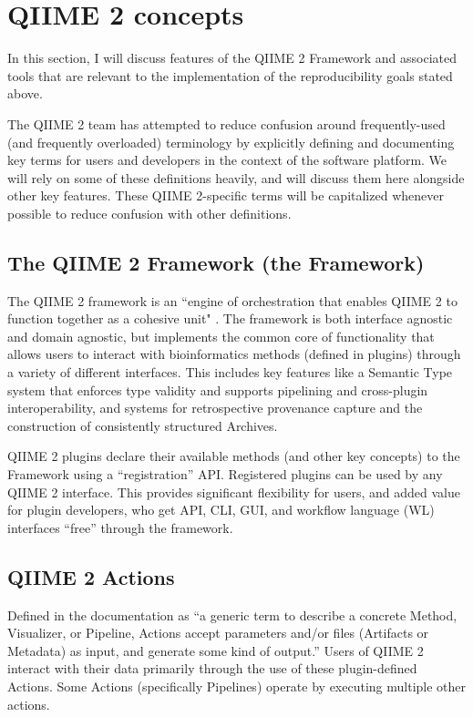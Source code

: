 \section{QIIME 2 concepts}

In this section, I will discuss features of the QIIME 2 Framework and associated
tools that are relevant to the implementation of the reproducibility goals
stated above. 

The QIIME 2 team has attempted to reduce confusion around frequently-used (and
frequently overloaded) terminology by explicitly defining and documenting key
terms for users \parencite{qiime_2_development_team_glossary_2016} and
developers \parencite{qiime_2_development_team_glossary_2018} in the context of
the software platform.  We will rely on some of these definitions heavily, and
will discuss them here alongside other key features. These QIIME 2-specific
terms will be capitalized whenever possible to reduce confusion with other
definitions.

\subsection{The QIIME 2 Framework (the Framework)}
The QIIME 2 framework is an “engine of orchestration that enables QIIME 2 to
function together as a cohesive unit" \parencite{qiime_2_development_team_glossary_2018}.
The framework is both interface agnostic and domain agnostic, but implements the
common core of functionality that allows users to interact with bioinformatics
methods (defined in plugins) through a variety of different interfaces. This
includes key features like a Semantic Type system that enforces type validity
and supports pipelining and cross-plugin interoperability, and systems for
retrospective provenance capture and the construction of consistently structured
Archives.

QIIME 2 plugins declare their available methods (and other key concepts) to the
Framework using a “registration” API. Registered plugins can be used by any
QIIME 2 interface. This provides significant flexibility for users, and added
value for plugin developers, who get API, CLI, GUI, and workflow language (WL)
interfaces “free” through the framework.

\subsection{QIIME 2 Actions}
Defined in the documentation as “a generic term to describe a concrete Method,
Visualizer, or Pipeline, Actions accept parameters and/or files (Artifacts or
Metadata) as input, and generate some kind of output.” Users of QIIME 2 interact
with their data primarily through the use of these plugin-defined Actions. Some
Actions (specifically Pipelines) operate by executing multiple other actions.

